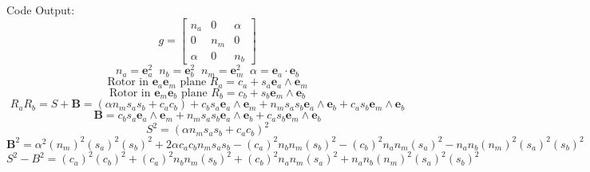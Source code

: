 \documentclass[10pt,fleqn]{report}
\begin{document}
Code Output:
\begin{equation*} g = \left[\begin{matrix}n_{a} & 0 & \alpha \\0 & n_{m} & 0\\\alpha  & 0 & n_{b}\end{matrix}\right] \end{equation*}
\begin{equation*} n_{a} = \bm{e}_{a}^{2}\;\;n_{b} = \bm{e}_{b}^{2}\;\;n_{m} = \bm{e}_{m}^{2}\;\;\alpha = \bm{e}_{a}\cdot\bm{e}_{b} \end{equation*}
\begin{equation*} \mbox{Rotor in }\bm{e}_{a}\bm{e}_{m}\mbox{ plane } R_{a} = c_{a}  + s_{a} \boldsymbol{e}_{a}\wedge \boldsymbol{e}_{m} \end{equation*}
\begin{equation*} \mbox{Rotor in }\bm{e}_{m}\bm{e}_{b}\mbox{ plane } R_{b} = c_{b}  + s_{b} \boldsymbol{e}_{m}\wedge \boldsymbol{e}_{b} \end{equation*}
\begin{equation*} R_{a}R_{b} = S+\bm{B} = \left ( \alpha  n_{m} s_{a} s_{b} + c_{a} c_{b}\right )  + c_{b} s_{a} \boldsymbol{e}_{a}\wedge \boldsymbol{e}_{m} + n_{m} s_{a} s_{b} \boldsymbol{e}_{a}\wedge \boldsymbol{e}_{b} + c_{a} s_{b} \boldsymbol{e}_{m}\wedge \boldsymbol{e}_{b} \end{equation*}
\begin{equation*} \bm{B} = c_{b} s_{a} \boldsymbol{e}_{a}\wedge \boldsymbol{e}_{m} + n_{m} s_{a} s_{b} \boldsymbol{e}_{a}\wedge \boldsymbol{e}_{b} + c_{a} s_{b} \boldsymbol{e}_{m}\wedge \boldsymbol{e}_{b} \end{equation*}
\begin{equation*} S^{2} = \left(\alpha  n_{m} s_{a} s_{b} + c_{a} c_{b}\right)^{2} \end{equation*}
\begin{equation*} \bm{B}^{2} = \alpha ^{2} {\left ( n_{m} \right )}^{2} {\left ( s_{a} \right )}^{2} {\left ( s_{b} \right )}^{2} + 2 \alpha  c_{a} c_{b} n_{m} s_{a} s_{b} - {\left ( c_{a} \right )}^{2} n_{b} n_{m} {\left ( s_{b} \right )}^{2} - {\left ( c_{b} \right )}^{2} n_{a} n_{m} {\left ( s_{a} \right )}^{2} - n_{a} n_{b} {\left ( n_{m} \right )}^{2} {\left ( s_{a} \right )}^{2} {\left ( s_{b} \right )}^{2} \end{equation*}
\begin{equation*} S^{2}-B^{2} = {\left ( c_{a} \right )}^{2} {\left ( c_{b} \right )}^{2} + {\left ( c_{a} \right )}^{2} n_{b} n_{m} {\left ( s_{b} \right )}^{2} + {\left ( c_{b} \right )}^{2} n_{a} n_{m} {\left ( s_{a} \right )}^{2} + n_{a} n_{b} {\left ( n_{m} \right )}^{2} {\left ( s_{a} \right )}^{2} {\left ( s_{b} \right )}^{2} \end{equation*}
\end{document}

